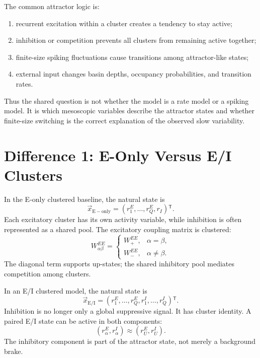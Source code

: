 The common attractor logic is:
%
\begin{enumerate}[leftmargin=*]
  \item recurrent excitation within a cluster creates a tendency to stay active;
  \item inhibition or competition prevents all clusters from remaining active together;
  \item finite-size spiking fluctuations cause transitions among attractor-like states;
  \item external input changes basin depths, occupancy probabilities, and transition rates.
\end{enumerate}

Thus the shared question is not whether the model is a rate model or a spiking model. It is which mesoscopic variables describe the attractor states and whether finite-size switching is the correct explanation of the observed slow variability.

\section{Difference 1: E-Only Versus E/I Clusters}
\label{sec:difference-e-only-versus-ei-clusters}

In the E-only clustered baseline, the natural state is
%
\begin{equation}
  \vec x_{\mathrm{E-only}}
  =
  (r_1^E,\ldots,r_Q^E,r_I){}^{\mathsf T}.
  \label{eq:e-only-state-ch14}
\end{equation}
%
Each excitatory cluster has its own activity variable, while inhibition is often represented as a shared pool. The excitatory coupling matrix is clustered:
%
\begin{equation}
  W_{\alpha\beta}^{EE}
  =
  \begin{cases}
    W_+^{EE}, & \alpha=\beta,\\
    W_-^{EE}, & \alpha\ne\beta.
  \end{cases}
  \label{eq:e-only-clustered-ee}
\end{equation}
%
The diagonal term supports up-states; the shared inhibitory pool mediates competition among clusters.

In an E/I clustered model, the natural state is
%
\begin{equation}
  \vec x_{\mathrm{E/I}}
  =
  (r_1^E,\ldots,r_Q^E,r_1^I,\ldots,r_Q^I){}^{\mathsf T}.
  \label{eq:ei-state-ch14}
\end{equation}
%
Inhibition is no longer only a global suppressive signal. It has cluster identity. A paired E/I state can be active in both components:
%
\begin{equation}
  (r_{\alpha}^{E},r_{\alpha}^{I})
  \approx
  (r_U^E,r_U^I).
  \label{eq:paired-active-state-ch14}
\end{equation}
%
The inhibitory component is part of the attractor state, not merely a background brake.

